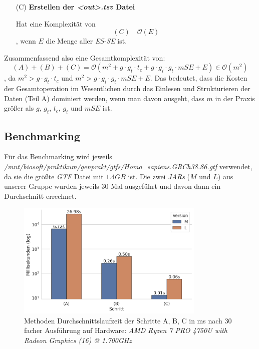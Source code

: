 \documentclass[12pt]{article}
\begin{document}
\begin{enumerate}
	\item[(C)] \textbf{Erstellen der \textit{<out>.tsv} Datei}

		Hat eine Komplexität von
		\begin{equation}
			(C) \hspace{1em} \mathcal{O}(E)
		\end{equation}
		, wenn $E$ die Menge aller \textit{ES-SE} ist.
\end{enumerate}

Zusammenfassend also eine Gesamtkomplexität von:
\begin{equation}
	(A) + (B) + (C) = \mathcal{O}( m^{2} + g \cdot g_{t} \cdot t_{c} + g \cdot g_{i} \cdot g_{t} \cdot mSE + E) \in \mathcal{O}(m^{2})
\end{equation}
, da $m^{2} > g \cdot g_{t} \cdot t_{c}$ und $m^{2} > g \cdot g_{i} \cdot g_{t} \cdot mSE + E$.
Das bedeutet, dass die Kosten der Gesamtoperation im Wesentlichen durch das Einlesen und Strukturieren der Daten (Teil A) dominiert werden,
wenn man davon ausgeht, dass $m$ in der Praxis größer als $g$, $g_{t}$, $t_{c}$, $g_{i}$ und $mSE$ ist.

\subsection{Benchmarking}
Für das Benchmarking wird jeweils \textit{/mnt/biosoft/praktikum/genprakt/gtfs/Homo\_sapiens.GRCh38.86.gtf} verwendet, da sie die grö\ss te \textit{GTF} Datei mit $1.4GB$ ist.
Die zwei \textit{JARs} ($M$ und $L$) aus unserer Gruppe wurden jeweils 30 Mal ausgeführt und davon dann ein Durchschnitt errechnet.

\begin{figure}[htpb]
	\centering
	\includegraphics[width=0.8\textwidth]{./plots/benchmark_time.jpg}
	\caption{Methoden Durchschnittslaufzeit der Schritte A, B, C  in ms nach 30 facher Ausführung auf Hardware: \textit{AMD Ryzen 7 PRO 4750U with Radeon Graphics (16) @ 1.700GHz}}

	\label{fig:-plots-benchmark_time-jpg}
\end{figure}
\end{document}
